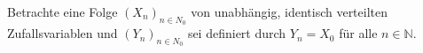Betrachte eine Folge ${(X_{n})}_{n \in N_{0}}$ von unabhängig, identisch verteilten Zufallsvariablen und ${(Y_{n})}_{n \in N_{0}}$ sei definiert durch $Y_{n} = X_{0}$ für alle $n \in \mathbb{N}$.